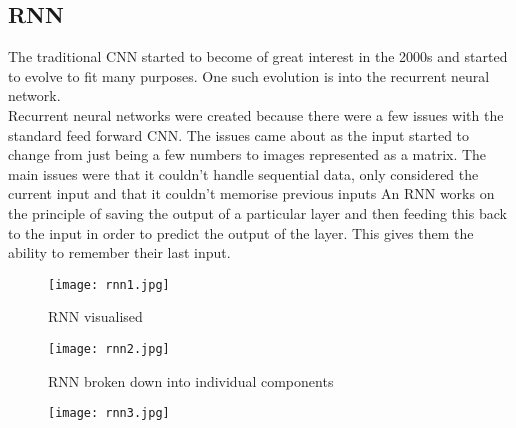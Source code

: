 \documentclass{article}
\begin{document}
\subsection{RNN}
The traditional CNN started to become of great interest in the 2000s and started to evolve to fit
many purposes. One such evolution is into the recurrent neural network.\\
Recurrent neural networks were created because there were a few issues with the standard feed
forward CNN. The issues came about as the input started to change from just being a few
numbers to images represented as a matrix. The main issues were that it couldn’t handle
sequential data, only considered the current input and that it couldn't memorise previous inputs
An RNN works on the principle of saving the output of a particular layer and then feeding this
back to the input in order to predict the output of the layer. This gives them the ability to
remember their last input.\\
\begin{figure}[h!]
    \centering
    \texttt{[image: rnn1.jpg]}
    \caption{RNN visualised }
\end{figure}
\begin{figure}[h!]
    \centering
    \texttt{[image: rnn2.jpg]}
    \caption{RNN broken down into individual components }
\end{figure}
\begin{figure}[h!]
    \centering
    \texttt{[image: rnn3.jpg]}
    \caption{}
\end{figure}
\end{document}
